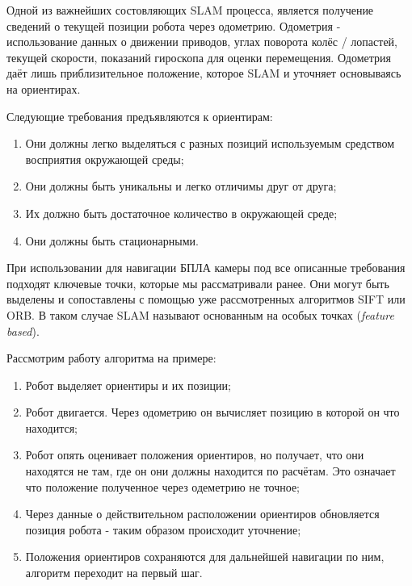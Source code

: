 \vspace{1em}
Одной из важнейших состовляющих SLAM процесса, является получение сведений о текущей позиции робота через одометрию. Одометрия - использование данных о движении приводов, углах поворота колёс / лопастей, текущей скорости, показаний гироскопа для оценки перемещения. Одометрия даёт лишь приблизительное положение, которое SLAM и уточняет основываясь на ориентирах.

\vspace{1em}
Следующие требования предъявляются к ориентирам:
\begin{enumerate}
    \item Они должны легко выделяться с разных позиций используемым средством восприятия окружающей среды;
    \item Они должны быть уникальны и легко отличимы друг от друга;
    \item Их должно быть достаточное количество в окружающей среде;
    \item Они должны быть стационарными.
\end{enumerate}

\vspace{1em}
При использовании для навигации БПЛА камеры под все описанные требования подходят ключевые точки, которые мы рассматривали ранее. Они могут быть выделены и сопоставлены с помощью уже рассмотренных алгоритмов SIFT или ORB. В таком случае SLAM называют основанным на особых точках (\textit{feature based}).

\vspace{1em}
Рассмотрим работу алгоритма на примере:
\begin{enumerate}
    \item Робот выделяет ориентиры и их позиции;
    \item Робот двигается. Через одометрию он вычисляет позицию в которой он  что находится;
    \item Робот опять оценивает положения ориентиров, но получает, что они находятся не там, где он  они должны находится по расчётам. Это означает что положение полученное через одеметрию не точное;
    \item Через данные о действительном расположении ориентиров обновляется позиция робота - таким образом происходит уточнение;
    \item Положения ориентиров сохраняются для дальнейшей навигации по ним, алгоритм переходит на первый шаг.
\end{enumerate}

